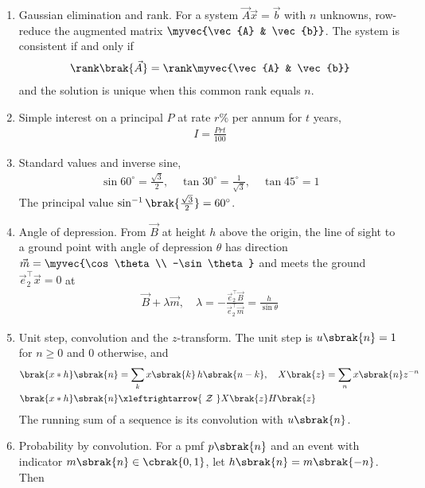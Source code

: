 \begin{enumerate}[label=\thesubsection.\arabic*, ref=\thesubsection.\theenumi]
\item Gaussian elimination and rank. For a system $\vec{A}\vec{x} = \vec{b}$ with $n$ unknowns, row-reduce the augmented matrix $\myvec{\vec{A} & \vec{b}}$. The system is consistent if and only if
\begin{align}
	\rank\brak{\vec{A}} = \rank\myvec{\vec{A} & \vec{b}} \label{eq:CBSE25S2-rank}
\end{align}
and the solution is unique when this common rank equals $n$.
\item Simple interest on a principal $P$ at rate $r\%$ per annum for $t$ years,
\begin{align}
	I = \frac{Prt}{100} \label{eq:CBSE25S2-interest}
\end{align}
\item Standard values and inverse sine,
\begin{align}
	\sin 60^\circ = \frac{\sqrt{3}}{2}, \quad \tan 30^\circ = \frac{1}{\sqrt{3}}, \quad \tan 45^\circ = 1 \label{eq:CBSE25S2-trig}
\end{align}
The principal value $\sin^{-1}\brak{\frac{\sqrt{3}}{2}} = 60^\circ$.
\item Angle of depression. From $\vec{B}$ at height $h$ above the origin, the line of sight to a ground point with angle of depression $\theta$ has direction $\vec{m} = \myvec{\cos\theta \\ -\sin\theta}$ and meets the ground $\vec{e}_2^{\top}\vec{x} = 0$ at
\begin{align}
	\vec{B} + \lambda\vec{m}, \quad \lambda = -\frac{\vec{e}_2^{\top}\vec{B}}{\vec{e}_2^{\top}\vec{m}} = \frac{h}{\sin\theta} \label{eq:CBSE25S2-depression}
\end{align}
\item Unit step, convolution and the $z$-transform. The unit step is $u\sbrak{n} = 1$ for $n \ge 0$ and $0$ otherwise, and
\begin{align}
	\brak{x * h}\sbrak{n} &= \sum_{k} x\sbrak{k}\,h\sbrak{n-k}, \quad
	X\brak{z} = \sum_{n} x\sbrak{n}z^{-n}
	\\
	\brak{x*h}\sbrak{n} &\xleftrightarrow{\ \mathcal{Z}\ } X\brak{z}H\brak{z} \label{eq:CBSE25S2-conv}
\end{align}
The running sum of a sequence is its convolution with $u\sbrak{n}$.
\item Probability by convolution. For a pmf $p\sbrak{n}$ and an event with indicator $m\sbrak{n} \in \cbrak{0,1}$, let $h\sbrak{n} = m\sbrak{-n}$. Then
\begin{align}

\end{align}
\end{enumerate}
